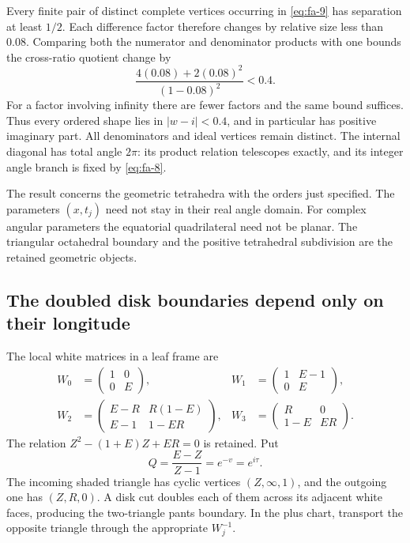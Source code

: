 Every finite pair of distinct complete vertices occurring in \eqref{eq:fa-9} has separation at least \(1/2\). Each difference factor therefore changes by relative size less than \(0.08\). Comparing both the numerator and denominator products with one bounds the cross-ratio quotient change by
\begin{equation}
\frac{4(0.08)+2(0.08)^2}{(1-0.08)^2}<0.4.
\label{eq:fa-11}
\end{equation}
For a factor involving infinity there are fewer factors and the same bound suffices. Thus every ordered shape lies in \(|w-i|<0.4\), and in particular has positive imaginary part. All denominators and ideal vertices remain distinct. The internal diagonal has total angle \(2\pi\): its product relation telescopes exactly, and its integer angle branch is fixed by \eqref{eq:fa-8}.

The result concerns the geometric tetrahedra with the orders just
specified. The parameters \((x,t_j)\) need not stay in their real
angle domain. For complex angular parameters the equatorial quadrilateral need not be planar. The triangular octahedral boundary and the positive tetrahedral subdivision are the retained geometric objects.

\subsection{The doubled disk boundaries depend only on their longitude}\label{sec:fa-4}

The local white matrices in a leaf frame are
\begin{equation}
\begin{aligned}
 W_0&=\begin{pmatrix}1&0\\0&E\end{pmatrix},&
 W_1&=\begin{pmatrix}1&E-1\\0&E\end{pmatrix},\\
 W_2&=\begin{pmatrix}E-R&R(1-E)\\E-1&1-ER\end{pmatrix},&
 W_3&=\begin{pmatrix}R&0\\1-E&ER\end{pmatrix}.
\end{aligned}
\label{eq:fa-12}
\end{equation}
The relation \(Z^2-(1+E)Z+ER=0\) is retained. Put
\begin{equation}
Q=\frac{E-Z}{Z-1}=e^{-v}=e^{i\tau}.
\label{eq:fa-13}
\end{equation}
The incoming shaded triangle has cyclic vertices \((Z,\infty,1)\), and the outgoing one has \((Z,R,0)\). A disk cut doubles each of them across its adjacent white faces, producing the two-triangle pants boundary. In the plus chart, transport the opposite triangle through the appropriate \(W_j^{-1}\).

